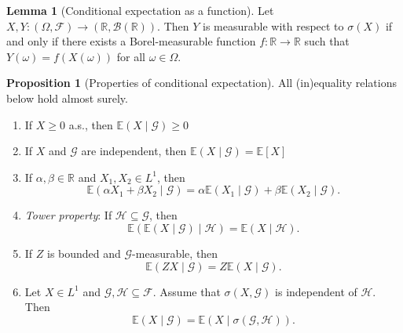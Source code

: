 \documentclass[parskip=full]{article}
\theoremstyle{definition}
\newtheorem{lemma}{Lemma}[theorem]
\newtheorem*{proposition}{Proposition}
\newcommand{\R}{\mathbb{R}}
\newcommand{\F}{\mathcal{F}}
\newcommand{\B}{\mathcal{B}}
\newcommand{\1}{\mathbbm{1}}
\newcommand{\E}{\mathbb{E}}
\begin{document}
\begin{lemma}[Conditional expectation as a function]
Let $X, Y: (\Omega, \F) \to (\R, \B(\R))$. Then $Y$ is measurable with respect to $\sigma(X)$ if and only if there exists a Borel-measurable function $f: \R \to \R$ such that $Y(\omega) = f(X(\omega))$ for all $\omega \in \Omega$.
\end{lemma}


\begin{proposition}[Properties of conditional expectation]
    All (in)equality relations below hold almost surely.
    \begin{enumerate}
      \item If $X \geq 0$ a.s., then $\E(X \mid \mathcal{G}) \geq 0$
      \item If $X$ and $\mathcal{G}$ are independent, then $\E(X \mid \mathcal{G}) = \E[X]$
      \item If $\alpha, \beta \in \R$ and $X_1, X_2 \in L^1$, then
        \[
          \E(\alpha X_1 + \beta X_2 \mid \mathcal{G}) = \alpha \E(X_1 \mid\mathcal{G}) + \beta \E(X_2 \mid \mathcal{G}).
        \]
      \item \emph{Tower property}: If $\mathcal{H} \subseteq \mathcal{G}$, then
        \[
          \E(\E(X \mid \mathcal{G}) \mid \mathcal{H}) = \E(X \mid \mathcal{H}).
        \]
        \item If $Z$ is bounded and $\mathcal{G}$-measurable, then
        \[
          \E(ZX \mid \mathcal{G}) = Z \E(X \mid \mathcal{G}).
        \]
      \item Let $X \in L^1$ and $\mathcal{G}, \mathcal{H} \subseteq \mathcal{F}$. Assume that $\sigma(X, \mathcal{G})$ is independent of $\mathcal{H}$. Then
        \[
          \E (X \mid \mathcal{G}) = \E(X \mid \sigma(\mathcal{G}, \mathcal{H})).
        \]
    \end{enumerate}
  \end{proposition}
\end{document}
